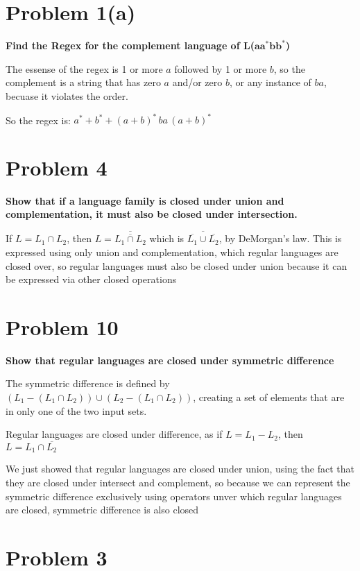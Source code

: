 \documentclass{report}
\newcommand{\doubleol}[1]{\overline{\overline{#1}}}
\begin{document}
\section*{Problem 1(a)}
\textbf{Find the Regex for the complement language of L($\mathbf{aa^*bb^*}$)}


The essense of the regex is 1 or more $a$ followed by 1 or more $b$, so the complement is a string that has zero $a$ and/or zero $b$, or any instance of $ba$, becuase it violates the order.

So the regex is: $a^* + b^* + (a+b)^* \, ba \, (a+b)^*$

\section*{Problem 4}
\textbf{Show that if a language family is closed under union and complementation, it must also be closed under intersection.}

If $L = L_1 \cap L_2$, then $L = \doubleol{L_1 \cap L_2}$ which is $ \overline{\overline{L_1} \cup \overline{L_2}}$, by DeMorgan's law.
This is expressed using only union and complementation, which regular languages are closed over, so regular languages must also be closed under union because it can be expressed via other closed operations

\section*{Problem 10}

\textbf{Show that regular languages are closed under symmetric difference}

The symmetric difference is defined by $\left( L_1 - \left( L_1 \cap L_2 \right) \right) \cup \left( L_2 - \left( L_1 \cap L_2 \right) \right)$, creating a set of elements that are in only one of the two input sets.

Regular languages are closed under difference, as if $L = L_1 - L_2$, then $L = L_1 \cap \overline{L_2}$

We just showed that regular languages are closed under union, using the fact that they are closed under intersect and complement, so because we can represent the symmetric difference exclusively using operators unver which regular languages are closed, symmetric difference is also closed


\section*{Problem 3}
\end{document}
